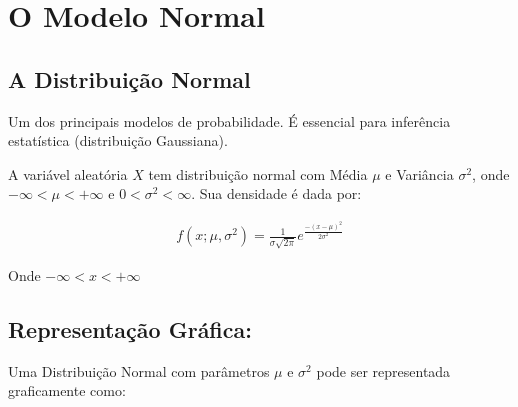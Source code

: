 \documentclass[
  letterpaper,
  DIV=11,
  numbers=noendperiod]{scrartcl}
\begin{document}
\section{O Modelo Normal}\label{o-modelo-normal}

\subsection{A Distribuição Normal}\label{a-distribuiuxe7uxe3o-normal}

Um dos principais modelos de probabilidade. É essencial para inferência
estatística (distribuição Gaussiana).

\begin{definicao}

A variável aleatória \(X\) tem distribuição normal com Média \(\mu\) e
Variância \(\sigma^{2}\), onde \(-\infty<\mu<+\infty\) e
\(0< \sigma^{2}< \infty\). Sua densidade é dada por:

\[\begin{array}{ccc}
f(x;\mu, \sigma^{2})=\frac{1}{\sigma \sqrt{2 \pi }} e^{\frac{-(x-\mu)^{2}}{2 \sigma^{2}}} 
\end{array}\]

Onde \(-\infty<x<+\infty\)

\end{definicao}

\subsection{Representação
Gráfica:}\label{representauxe7uxe3o-gruxe1fica}

Uma Distribuição Normal com parâmetros \(\mu\) e \(\sigma^{2}\) pode ser
representada graficamente como:\\
\end{document}
